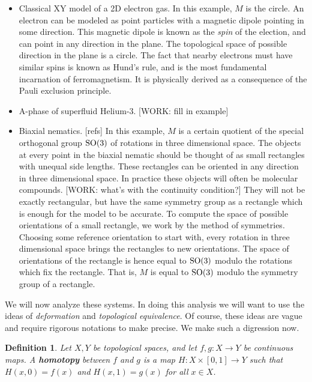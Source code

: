 \documentclass{article}
\newtheorem*{definition}{Definition}
\theoremstyle{definition}
\numberwithin{figure}{section}
\begin{document}
\begin{itemize}
\item Classical XY model of a 2D electron gas. In this example, $M$ is the circle. An electron can be modeled as point particles with a magnetic dipole pointing in some direction. This magnetic dipole is known as the \textit{spin} of the election, and can point in any direction in the plane. The topological space of possible direction in the plane is a circle. The fact that nearby electrons must have similar spins is known as Hund’s rule, and is the most fundamental incarnation of ferromagnetism. It is physically derived as a consequence of the Pauli exclusion principle.

\item A-phase of superfluid Helium-3.  [WORK: fill in example]

\item Biaxial nematics. [refs] In this example, $M$ is a certain quotient of the special orthogonal group $\mathrm{SO}(3)$ of rotations in three dimensional space. The objects at every point in the biaxial nematic should be thought of as small rectangles with unequal side lengths. These rectangles can be oriented in any direction in three dimensional space. In practice these objects will often be molecular compounds. [WORK: what’s with the continuity condition?] They will not be exactly rectangular, but have the same symmetry group as a rectangle which is enough for the model to be accurate. To compute the space of possible orientations of a small rectangle, we work by the method of symmetries. Choosing some reference orientation to start with, every rotation in three dimensional space brings the rectangles to new orientations. The space of orientations of the rectangle is hence equal to $\mathrm{SO}(3)$ modulo the rotations which fix the rectangle. That is, $M$ is equal to $\mathrm{SO}(3)$ modulo the symmetry group of a rectangle.
\end{itemize}

We will now analyze these systems. In doing this analysis we will want to use the ideas of \textit{deformation} and \textit{topological equivalence}. Of course, these ideas are vague and require rigorous notations to make precise. We make such a digression now.

\begin{definition}
Let $X,Y$ be topological spaces, and let $f,g: X\to Y$ be continuous maps. A \textbf{homotopy} between $f$ and $g$ is a map $H: X\times [0,1] \to Y$ such that $H(x, 0)=f(x)$ and $H(x,1)=g(x)$ for all $x\in X$.
\end{definition}
\end{document}
